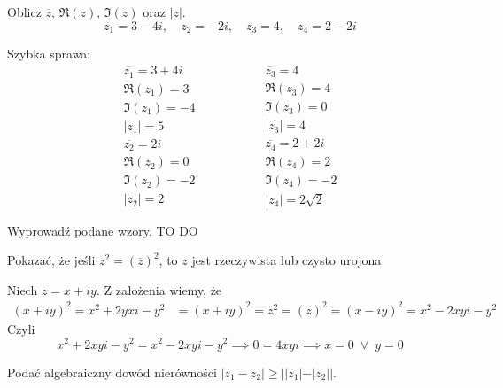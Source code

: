 \begin{problem}
  Oblicz $\overline{z}$, $\Re(z)$, $\Im(z)$ oraz $|z|$.
  $$z_1=3-4i,\quad z_2=-2i, \quad z_3=4, \quad z_4=2-2i$$
\end{problem}

\begin{solution}
  Szybka sprawa:
  $$
    \begin{matrix}
      \overline{z_1}=3+4i\\ 
    \Re(z_1)=3\\ 
    \Im(z_1)=-4\\
    |z_1|=5\\ 
    \overline{z_2}=2i\\ 
    \Re(z_2)=0\\ 
    \Im(z_2)=-2\\ 
    |z_2|=2 
  \end{matrix}\quad \; \quad \; \quad \; \quad
    \begin{matrix}
    \overline{z_3}=4\\  
    \Re(z_3)=4\\ 
    \Im(z_3)=0\\ 
    |z_3|=4\\ 
    \overline{z_4}=2+2i\\ 
    \Re(z_4)=2\\ 
    \Im(z_4)=-2\\ 
    |z_4|=2\sqrt{2}
    \end{matrix}
  $$
\end{solution}

\begin{problem}
  Wyprowadź podane wzory.
  {\large\color{red}TO DO}
\end{problem}

\begin{problem}
  Pokazać, że jeśli $z^2=(\overline{z})^2$, to $z$ jest rzeczywista lub czysto urojona
\end{problem}

\begin{solution}
  Niech $z=x+iy$. Z założenia wiemy, że
  \begin{align*}
    (x+iy)^2=x^2+2yxi-y^2&=(x+iy)^2=z^2=(\overline{z})^2=(x-iy)^2=x^2-2xyi-y^2
  \end{align*}
  Czyli
  $$x^2+2xyi-y^2=x^2-2xyi-y^2\implies 0=4xyi\implies x=0\;\lor\;y=0$$
\end{solution}

\begin{problem}
  Podać algebraiczny dowód nierówności $|z_1-z_2|\geq ||z_1|-|z_2||$.
\end{problem}

